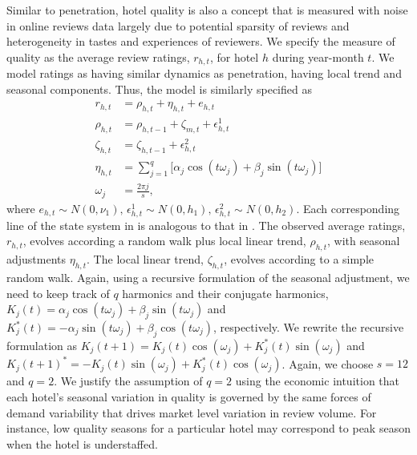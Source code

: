 \documentclass[mksc,blindrev]{informs3} %
\begin{document}
Similar to penetration, hotel quality is also a concept that is measured with noise in online reviews data largely due to potential sparsity of reviews and heterogeneity in tastes and experiences of reviewers. We specify the measure of quality as the average review ratings, $r_{h,t}$, for hotel $h$ during year-month $t$. We model ratings as having similar dynamics as penetration, having local trend and seasonal components. Thus, the model is similarly specified as 
\begin{equation}\label{eq:ratings_dlm}
\begin{split}
r_{h,t}&=\rho_{h,t}+\eta_{h,t}+e_{h,t}\\
\rho_{h,t}&=\rho_{h,t-1}+\zeta_{m,t}+\epsilon_{h,t}^{1} \\
\zeta_{h,t} &= \zeta_{h,t-1} +\epsilon_{h,t}^{2} \\
\eta_{h,t} &=\sum_{j=1}^{q}\big[\alpha_j\cos(t\omega_j)+\beta_j\sin(t\omega_j)\big] \\
\omega_j &= \frac{2\pi j}{s},
\end{split}
\end{equation}
where $e_{h,t}\sim N(0,\nu_1)\text{, }\epsilon_{h,t}^{1}\sim N(0,h_1)\text{, }\epsilon_{h,t}^{2}\sim N(0,h_2)$. Each corresponding line of the state system in  is analogous to that in . The observed average ratings, $r_{h,t}$, evolves according a random walk plus local linear trend, $\rho_{h,t}$, with seasonal adjustments $\eta_{h,t}$. The local linear trend, $\zeta_{h,t}$, evolves according to a simple random walk. Again, using a recursive formulation of the seasonal adjustment, we need to keep track of $q$ harmonics and their conjugate harmonics, $K_j(t)=\alpha_j\cos(t\omega_j)+\beta_j\sin(t\omega_j)$ and $K_j^{*}(t)=-\alpha_j\sin(t\omega_j)+\beta_j\cos(t\omega_j)$, respectively. We rewrite the recursive formulation as $K_j(t+1)=K_j(t)\cos(\omega_j)+K_j^{*}(t)\sin(\omega_j)$ and $K_j(t+1)^{*}=-K_j(t)\sin(\omega_j)+K_j^{*}(t)\cos(\omega_j)$. Again, we choose $s=12$ and $q=2$. We justify the assumption of $q=2$ using the economic intuition that each hotel's seasonal variation in quality is governed by the same forces of demand variability that drives market level variation in review volume. For instance, low quality seasons for a particular hotel may correspond to peak season when the hotel is understaffed.
\end{document}
